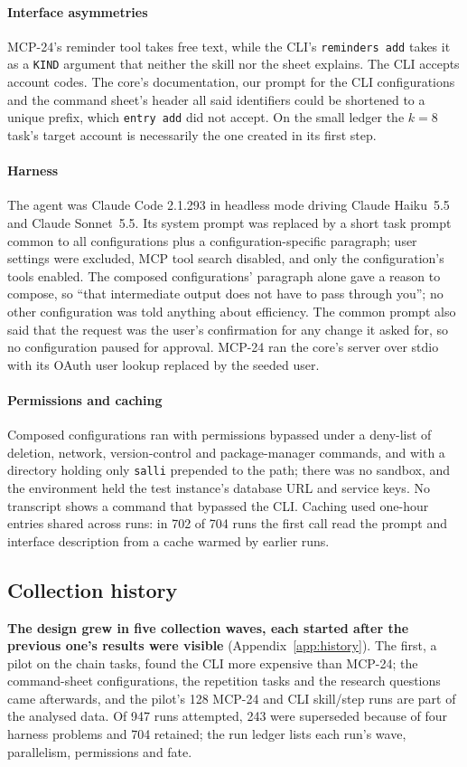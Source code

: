 \documentclass[sigconf,nonacm]{acmart}
\newcommand{\cmd}[1]{\texttt{#1}}
\newcommand{\cfg}[1]{\textsf{#1}}
\newcommand{\finding}[1]{\textbf{#1}}
\begin{document}
\paragraph{Interface asymmetries}
\cfg{MCP-24}'s reminder tool takes free text, while the CLI's \cmd{reminders add} takes it as a \texttt{KIND} argument that neither the skill nor the sheet explains. The CLI accepts account codes. The core's documentation, our prompt for the CLI configurations and the command sheet's header all said identifiers could be shortened to a unique prefix, which \cmd{entry add} did not accept. On the small ledger the $k=8$ task's target account is necessarily the one created in its first step.

\paragraph{Harness}
The agent was Claude Code 2.1.293 in headless mode driving Claude Haiku~5.5 and Claude Sonnet~5.5. Its system prompt was replaced by a short task prompt common to all configurations plus a configuration-specific paragraph; user settings were excluded, MCP tool search disabled, and only the configuration's tools enabled. The composed configurations' paragraph alone gave a reason to compose, so ``that intermediate output does not have to pass through you''; no other configuration was told anything about efficiency. The common prompt also said that the request was the user's confirmation for any change it asked for, so no configuration paused for approval. \cfg{MCP-24} ran the core's server over stdio with its OAuth user lookup replaced by the seeded user.

\paragraph{Permissions and caching}
Composed configurations ran with permissions bypassed under a deny-list of deletion, network, version-control and package-manager commands, and with a directory holding only \cmd{salli} prepended to the path; there was no sandbox, and the environment held the test instance's database URL and service keys. No transcript shows a command that bypassed the CLI. Caching used one-hour entries shared across runs: in 702 of 704 runs the first call read the prompt and interface description from a cache warmed by earlier runs.

\subsection{Collection history}
\label{sec:history}
\finding{The design grew in five collection waves, each started after the previous one's results were visible} (Appendix~\ref{app:history}). The first, a pilot on the chain tasks, found the CLI more expensive than \cfg{MCP-24}; the command-sheet configurations, the repetition tasks and the research questions came afterwards, and the pilot's 128 \cfg{MCP-24} and \cfg{CLI skill/step} runs are part of the analysed data. Of 947 runs attempted, 243 were superseded because of four harness problems and 704 retained; the run ledger lists each run's wave, parallelism, permissions and fate.
\end{document}
